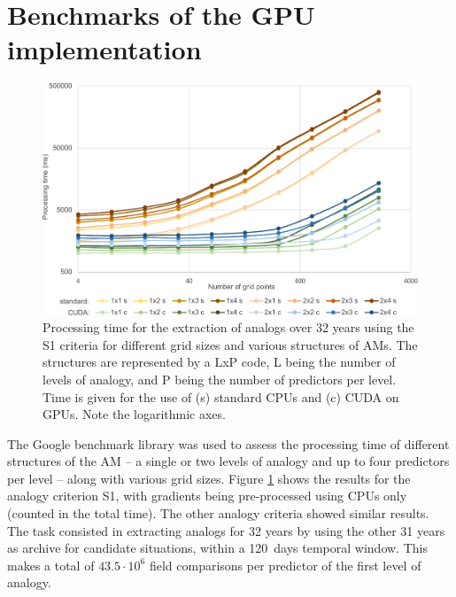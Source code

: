 \documentclass[draft]{agujournal2019}
\begin{document}


%
%

\FloatBarrier

\appendix

\section{Benchmarks of the GPU implementation}

\begin{figure}
	\noindent\includegraphics[width=130mm]{figures/cuda-timing.pdf}
	\caption{Processing time for the extraction of analogs over 32 years using the S1 criteria for different grid sizes and various structures of AMs. The structures are represented by a LxP code, L being the number of levels of analogy, and P being the number of predictors per level. Time is given for the use of (s) standard CPUs and (c) CUDA on GPUs. Note the logarithmic axes.}
	\label{cuda}
\end{figure}

The Google benchmark library was used to assess the processing time of different structures of the AM -- a single or two levels of analogy and up to four predictors per level -- along with various grid sizes. Figure \ref{cuda} shows the results for the analogy criterion S1, with gradients being pre-processed using CPUs only (counted in the total time). The other analogy criteria showed similar results. The task consisted in extracting analogs for 32 years by using the other 31 years as archive for candidate situations, within a 120~days temporal window. This makes a total of $43.5\cdot10^6$ field comparisons per predictor of the first level of analogy.
\end{document}

